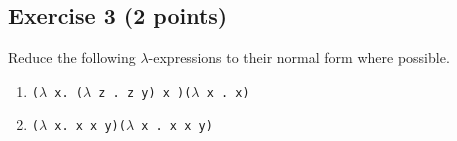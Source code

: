 \documentclass [11pt, a4wide, twoside]{article}
\begin{document}
\newpage
\solution{\fontsize{9pt}{11pt}}

%
\subsection*{Exercise 3 (2 points)}

Reduce the following $\lambda$-expressions to their normal form where possible. 

\begin{enumerate}
\item \texttt{($\lambda$ x. ($\lambda$ z . z y) x )($\lambda$ x . x)}
\item \texttt{($\lambda$ x. x x y)($\lambda$ x . x x y)}

\vspace{0.2cm}
\solution{\fontsize{9pt}{11pt}}


\end{enumerate}
\end{document}
